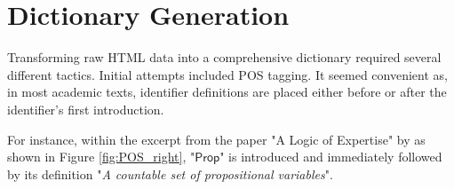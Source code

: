 \begin{table}[htpb]
  \centering
  \quad 
  \caption[Token Usages]{Token usages of three different types of encoding (\LaTeX, ASCII Math, and XML).}
  \label{fig:ascii-math}
\end{table}



\section{Dictionary Generation}\label{sec:dic-generation}

Transforming raw HTML data into a comprehensive dictionary required several different tactics. Initial attempts included \ac{POS} tagging. It seemed convenient as, in most academic texts, identifier definitions are placed either before or after the identifier's first introduction.

For instance, within the excerpt from the paper "A Logic of Expertise" by  \citet{singleton2021logic} as shown in Figure \ref{fig:POS_right}, "$\mathsf{Prop}$" is introduced and immediately followed by its definition "\textit{A countable set of propositional variables}".

